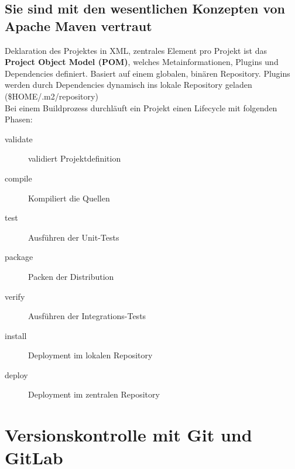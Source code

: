 \documentclass[a4paper]{article}
\begin{document}
		\subsection{Sie sind mit den wesentlichen Konzepten von Apache Maven vertraut}
		Deklaration des Projektes in XML, zentrales Element pro Projekt ist das \textbf{Project Object Model (POM)}, welches Metainformationen, Plugins und Dependencies definiert. Basiert auf einem globalen, binären Repository. Plugins werden durch Dependencies dynamisch ins lokale Repository geladen (\$HOME/.m2/repository)\\
		Bei einem Buildprozess durchläuft ein Projekt einen Lifecycle mit folgenden Phasen:
		\begin{description}
			\item[validate] validiert Projektdefinition
			\item[compile] Kompiliert die Quellen
			\item[test] Ausführen der Unit-Tests
			\item[package] Packen der Distribution
			\item[verify] Ausführen der Integrations-Tests
			\item[install] Deployment im lokalen Repository
			\item[deploy] Deployment im zentralen Repository
		\end{description}
	
	\newpage	
	\section{Versionskontrolle mit Git und GitLab}
	
\end{document}
